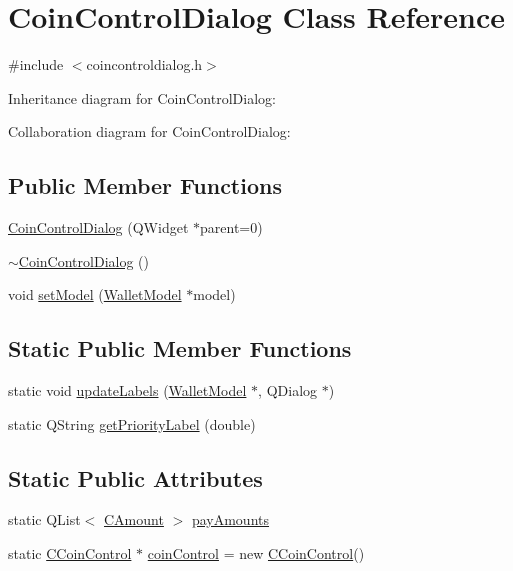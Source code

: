 \hypertarget{class_coin_control_dialog}{}\section{Coin\+Control\+Dialog Class Reference}
\label{class_coin_control_dialog}


{\ttfamily \#include $<$coincontroldialog.\+h$>$}



Inheritance diagram for Coin\+Control\+Dialog\+:


Collaboration diagram for Coin\+Control\+Dialog\+:
\subsection*{Public Member Functions}
\begin{DoxyCompactItemize}
\item 
\hyperlink{class_coin_control_dialog_a0945e59c25f956fdab199dbaf252eff5}{Coin\+Control\+Dialog} (Q\+Widget $\ast$parent=0)
\item 
\hyperlink{class_coin_control_dialog_abbd976ba19011319d5e189f87db66e31}{$\sim$\+Coin\+Control\+Dialog} ()
\item 
void \hyperlink{class_coin_control_dialog_a4c34a48574814089c54f763a22f5317a}{set\+Model} (\hyperlink{class_wallet_model}{Wallet\+Model} $\ast$model)
\end{DoxyCompactItemize}
\subsection*{Static Public Member Functions}
\begin{DoxyCompactItemize}
\item 
static void \hyperlink{class_coin_control_dialog_a4fc60e89b097952ff22dc0f9c58c87d9}{update\+Labels} (\hyperlink{class_wallet_model}{Wallet\+Model} $\ast$, Q\+Dialog $\ast$)
\item 
static Q\+String \hyperlink{class_coin_control_dialog_a7285f91e6d9b510084966f4229146bcd}{get\+Priority\+Label} (double)
\end{DoxyCompactItemize}
\subsection*{Static Public Attributes}
\begin{DoxyCompactItemize}
\item 
static Q\+List$<$ \hyperlink{amount_8h_a4eaf3a5239714d8c45b851527f7cb564}{C\+Amount} $>$ \hyperlink{class_coin_control_dialog_af4dd184087c7b34ac68392bec2968d15}{pay\+Amounts}
\item 
static \hyperlink{class_c_coin_control}{C\+Coin\+Control} $\ast$ \hyperlink{class_coin_control_dialog_a9d4514c4fbb1fe19cb3aa121da083bc7}{coin\+Control} = new \hyperlink{class_c_coin_control}{C\+Coin\+Control}()
\end{DoxyCompactItemize}


